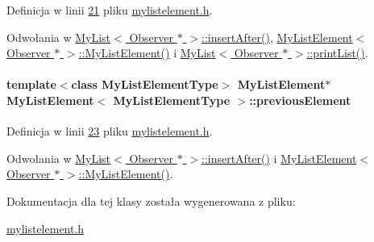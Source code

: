 Definicja w linii \hyperlink{mylistelement_8h_source_l00021}{21} pliku \hyperlink{mylistelement_8h_source}{mylistelement.\-h}.



Odwołania w \hyperlink{mylist_8h_source_l00212}{My\-List$<$ Observer $\ast$ $>$\-::insert\-After()}, \hyperlink{mylistelement_8h_source_l00028}{My\-List\-Element$<$ Observer $\ast$ $>$\-::\-My\-List\-Element()} i \hyperlink{mylist_8h_source_l00156}{My\-List$<$ Observer $\ast$ $>$\-::print\-List()}.

\hypertarget{class_my_list_element_ae52a44c22eb3916df4bd87672e9423c7}{
\paragraph[{previous\-Element}]{\setlength{\rightskip}{0pt plus 5cm}template$<$class My\-List\-Element\-Type$>$ {\bf My\-List\-Element}$\ast$ {\bf My\-List\-Element}$<$ My\-List\-Element\-Type $>$\-::previous\-Element}}\label{class_my_list_element_ae52a44c22eb3916df4bd87672e9423c7}


Definicja w linii \hyperlink{mylistelement_8h_source_l00023}{23} pliku \hyperlink{mylistelement_8h_source}{mylistelement.\-h}.



Odwołania w \hyperlink{mylist_8h_source_l00212}{My\-List$<$ Observer $\ast$ $>$\-::insert\-After()} i \hyperlink{mylistelement_8h_source_l00028}{My\-List\-Element$<$ Observer $\ast$ $>$\-::\-My\-List\-Element()}.



Dokumentacja dla tej klasy została wygenerowana z pliku\-:\begin{DoxyCompactItemize}
\item 
\hyperlink{mylistelement_8h}{mylistelement.\-h}\end{DoxyCompactItemize}
